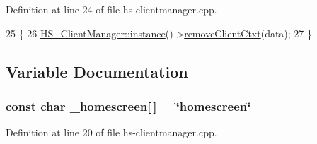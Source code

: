 Definition at line 24 of file hs-\/clientmanager.\+cpp.


\begin{DoxyCode}
25 \{
26     \hyperlink{class_h_s___client_manager_ad86c1fea7d107d52cbf0466fb7a2658b}{HS\_ClientManager::instance}()->\hyperlink{class_h_s___client_manager_adc23f8b3f5cc06eeab39fb24098af3e2}{removeClientCtxt}(data);
27 \}
\end{DoxyCode}


\subsection{Variable Documentation}
\subsubsection[{\texorpdfstring{\+\_\+homescreen}{_homescreen}}]{\setlength{\rightskip}{0pt plus 5cm}const char \+\_\+homescreen\mbox{[}$\,$\mbox{]} = \char`\"{}homescreen\char`\"{}\hspace{0.3cm}{\ttfamily [static]}}\hypertarget{hs-clientmanager_8cpp_a8bbab9002543614eacdc7a319d13a476}{}\label{hs-clientmanager_8cpp_a8bbab9002543614eacdc7a319d13a476}


Definition at line 20 of file hs-\/clientmanager.\+cpp.

